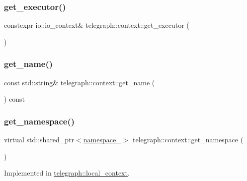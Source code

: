 \subsubsection{\texorpdfstring{get\+\_\+executor()}{get\_executor()}}
{\footnotesize\ttfamily constexpr io\+::io\+\_\+context\& telegraph\+::context\+::get\+\_\+executor (\begin{DoxyParamCaption}{ }\end{DoxyParamCaption})\hspace{0.3cm}{\ttfamily [inline]}}

\mbox{\label{classtelegraph_1_1context_a56bd2af5bbfcdc234f6dd8df052585d7}} 
\subsubsection{\texorpdfstring{get\+\_\+name()}{get\_name()}}
{\footnotesize\ttfamily const std\+::string\& telegraph\+::context\+::get\+\_\+name (\begin{DoxyParamCaption}{ }\end{DoxyParamCaption}) const\hspace{0.3cm}{\ttfamily [inline]}}

\mbox{\label{classtelegraph_1_1context_a84d92cca54be9c4e885e2673480e45a1}} 
\subsubsection{\texorpdfstring{get\+\_\+namespace()}{get\_namespace()}\hspace{0.1cm}{\footnotesize\ttfamily [1/2]}}
{\footnotesize\ttfamily virtual std\+::shared\+\_\+ptr$<$\hyperlink{classtelegraph_1_1namespace__}{namespace\+\_\+}$>$ telegraph\+::context\+::get\+\_\+namespace (\begin{DoxyParamCaption}{ }\end{DoxyParamCaption})\hspace{0.3cm}{\ttfamily [pure virtual]}}



Implemented in \hyperlink{classtelegraph_1_1local__context_a71a19090a93c3193615e61940fba918a}{telegraph\+::local\+\_\+context}.

